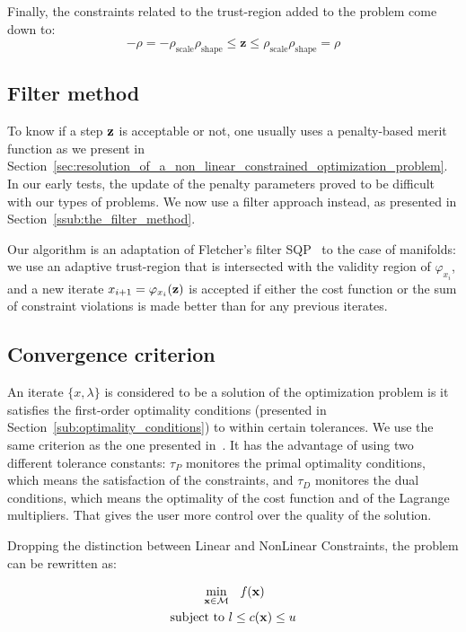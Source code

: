 Finally, the constraints related to the trust-region added to the problem come down to:
\begin{equation}
  -\rho = -\rho_\text{scale}\rho_\text{shape} \leq \mathbf{z} \leq \rho_\text{scale}\rho_\text{shape} = \rho
\end{equation}

\subsection{Filter method}
\label{sub:filter_method}

To know if a step ${\bf z}$ is acceptable or not, one usually uses a penalty-based merit function as we present in Section~\ref{sec:resolution_of_a_non_linear_constrained_optimization_problem}.
In our early tests, the update of the penalty parameters proved to be difficult with our types of problems.
We now use a filter approach instead, as presented in Section~\ref{ssub:the_filter_method}.

Our algorithm is an adaptation of Fletcher's filter SQP~\cite{fletcher:mathprog:2000} to the case of manifolds: we use an adaptive trust-region that is intersected with the validity region of $\varphi_{x_i}$, and a new iterate $x_{i+1} = \varphi_{x_i}({\bf z})$ is accepted if either the cost function or the sum of constraint violations is made better than for any previous iterates.

\subsection{Convergence criterion}
\label{sub:convergence_criterion}

An iterate $\{x,\lambda\}$ is considered to be a solution of the optimization problem is it satisfies the first-order optimality conditions (presented in Section~\ref{sub:optimality_conditions}) to within certain tolerances.
We use the same criterion as the one presented in~\cite{gill:snopt:2002}.
It has the advantage of using two different tolerance constants: $\tau_P$ monitores the primal optimality conditions, which means the satisfaction of the constraints, and $\tau_D$ monitores the dual conditions, which means the optimality of the cost function and of the Lagrange multipliers.
That gives the user more control over the quality of the solution.

Dropping the distinction between Linear and NonLinear Constraints,
the problem can be rewritten as:

\begin{align}
\begin{split}
\label{eq:problem}
  \min_{\bf x \in \mathcal{M}} & \quad \mbox{\emph{f}}({\bf x}) \\
  \text{subject to }&
  l \leq c({\bf x}) \leq u \\
\end{split}
\end{align}

